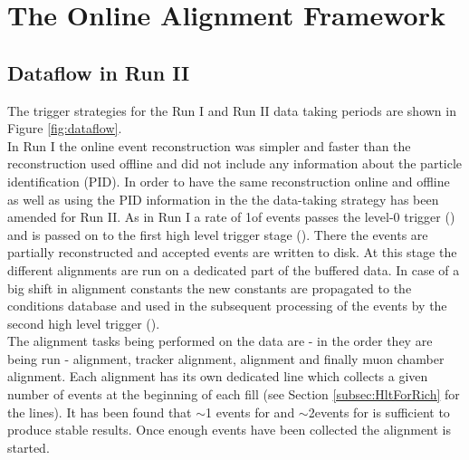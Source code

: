 \section{The Online Alignment Framework}
\label{sec:OnlineAlignmentFramework}

\subsection{Dataflow in Run II}
\label{subsec:Dataflow}
The \lhcb trigger strategies for the Run I and Run II data taking periods are shown in Figure \ref{fig:dataflow}.\\
In Run I the online event reconstruction was simpler and faster than the reconstruction used offline and did not include any information about the particle identification (PID). In order to have the same reconstruction online and offline as well as using the PID information in the \hlttwo the data-taking strategy has been amended for Run II. As in Run I a rate of 1\mhz of events passes the level-0 trigger (\lone) and is passed on to the first high level trigger stage (\hltone). There the events are partially reconstructed and accepted events are written to disk. At this stage the different alignments are run on a dedicated part of the buffered data. In case of a big shift in alignment constants the new constants are propagated to the \lhcb conditions database and used in the subsequent processing of the events by the second high level trigger (\hlttwo).\\
The alignment tasks being performed on the data are - in the order they are being run - \velo alignment, tracker alignment, \rich alignment and finally muon chamber alignment. Each alignment has its own dedicated \hltone line which collects a given number of events at the beginning of each fill (see Section \ref{subsec:HltForRich} for the \rich lines). It has been found that $\sim$1 \m events for \richone and $\sim$2\m events for \richtwo is sufficient to produce stable results. Once enough events have been collected the alignment is started.\\
